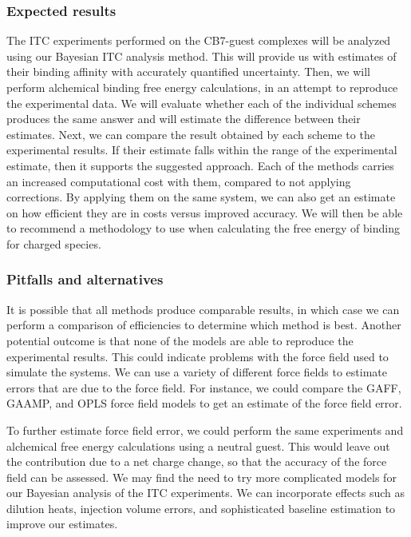 \documentclass[10pt,final]{article}
\begin{document}
\subsubsection*{Expected results}
The ITC experiments performed on the CB7-guest complexes will be analyzed using our Bayesian ITC analysis method.
%
This will provide us with estimates of their binding affinity with accurately quantified uncertainty. 
%
Then, we will perform alchemical binding free energy calculations, in an attempt to reproduce the experimental data.
%
We will evaluate whether each of the individual schemes produces the same answer and will estimate the difference between their estimates. 
%
Next, we can compare the result obtained by each scheme to the experimental results. If their estimate falls within the range of the experimental estimate, then it supports the suggested approach.
%
Each of the methods carries an increased computational cost with them, compared to not applying corrections.
%
By applying them on the same system, we can also get an estimate on how efficient they are in costs versus improved accuracy.
%
We will then be able to recommend a methodology to use when calculating the free energy of binding for charged species.


\subsubsection*{Pitfalls and alternatives}
It is possible that all methods produce comparable results, in which case we can perform a comparison of efficiencies to determine which method is best.
%
Another potential outcome is that none of the models are able to reproduce the experimental results.
%
This could indicate problems with the force field used to simulate the systems.
%
We can use a variety of different force fields to estimate errors that are due to the force field.
%
For instance, we could compare the GAFF\autocite{Wang2004a}, GAAMP\autocite{Huang2013a}, and OPLS\autocite{Schroedinger2014b} force field models to get an estimate of the force field error. 

To further estimate force field error, we could perform the same experiments and alchemical free energy calculations using a neutral guest. 
%
This would leave out the contribution due to a net charge change, so that the accuracy of the force field can be assessed.
%
We may find the need to try more complicated models for our Bayesian analysis of the ITC experiments.
%
We can incorporate effects such as dilution heats, injection volume errors, and sophisticated baseline estimation to improve our estimates.
\end{document}
